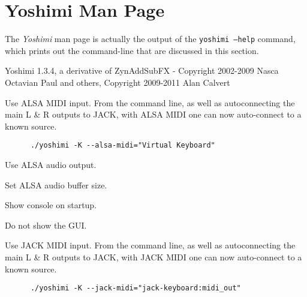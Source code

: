 %
%
%

\section{Yoshimi Man Page}
\label{sec:yoshimi_man_page}

   The \textsl{Yoshimi} man page is actually the output of the
   \texttt{yoshimi --help} command, which prints out the command-line that
   are discussed in this section.

Yoshimi 1.3.4, a derivative of ZynAddSubFX - Copyright 2002-2009
Nasca Octavian Paul and others, Copyright 2009-2011 Alan Calvert

   \setcounter{ItemCounter}{0}      %

      Use ALSA MIDI input.
      From the command line, as well as autoconnecting the main L \& R
      outputs to JACK, with ALSA MIDI one can now auto-connect to a known source.

   \begin{verbatim}
      ./yoshimi -K --alsa-midi="Virtual Keyboard"
   \end{verbatim}

      Use ALSA audio output.

      Set ALSA audio buffer size.

      Show console on startup.

      Do not show the GUI.

      Use JACK MIDI input.
      From the command line, as well as autoconnecting the main L \& R
      outputs to JACK, with JACK MIDI one can now auto-connect to a known source.

   \begin{verbatim}
      ./yoshimi -K --jack-midi="jack-keyboard:midi_out"
   \end{verbatim}


